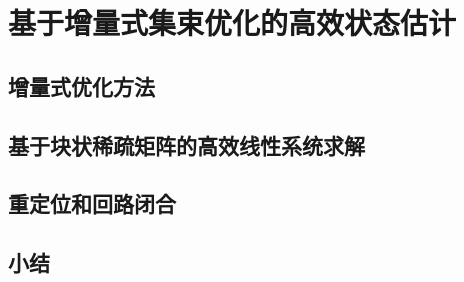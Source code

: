 \chapter{基于增量式集束优化的高效状态估计}

\section{增量式优化方法}

\section{基于块状稀疏矩阵的高效线性系统求解}

\section{重定位和回路闭合}

\section{小结}
